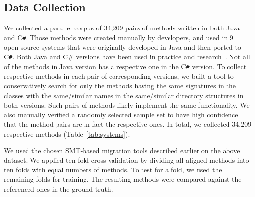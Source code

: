 \subsection{Data Collection}

We collected a parallel corpus of 34,209 pairs of methods written in
both Java and C\texttt{\#}. Those methods were created manually by
developers, and used in 9 open-source systems that were originally
developed in Java and then ported to C\texttt{\#}.
%
Both Java and C\# versions have been used in practice and
research~\cite{ase15}.
%
Not all of the methods in Java version has a respective one in the
C\texttt{\#} version. To collect respective methods in each pair of
corresponding versions, we built a tool to conservatively search for
only the methods having the same signatures in the classes with the
same/similar names in the same/similar directory structures in both
versions. Such pairs of methods likely implement the same
functionality. We also manually verified a randomly selected
sample set to have high confidence that the method pairs are in fact
the respective ones. In total, we collected 34,209 respective methods
(Table~\ref{tab:systems}).




We used the chosen SMT-based migration tools described earlier on the
above dataset. We applied ten-fold cross validation by dividing all
aligned methods into ten folds with equal numbers of methods. To
test for a fold, we used the remaining folds for training. The
resulting methods were compared against the referenced ones in the
ground truth.



